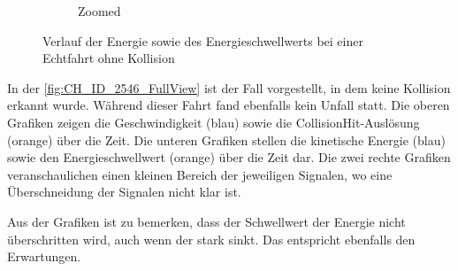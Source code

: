 \begin{figure}[H]
\begin{subfigure}{0.41\textwidth}
		\caption{Zoomed}
		\label{fig:CH_speed_CHEnergy_zoomed_eps}
	\end{subfigure}
	\caption{Verlauf der Energie sowie des Energieschwellwerts bei einer Echtfahrt ohne Kollision}
	\label{fig:CH_ID_2546_FullView}
\end{figure}


In der \autoref{fig:CH_ID_2546_FullView} ist der Fall vorgestellt, in dem keine Kollision erkannt wurde. Während dieser Fahrt fand ebenfalls kein Unfall statt. 
Die oberen Grafiken zeigen die Geschwindigkeit (blau) sowie die CollisionHit-Auslösung (orange) über die Zeit.
Die unteren Grafiken stellen die kinetische Energie (blau) sowie den Energieschwellwert (orange) über die Zeit dar.
Die zwei rechte Grafiken veranschaulichen einen kleinen Bereich der jeweiligen Signalen, wo eine Überschneidung der Signalen nicht klar ist.

Aus der Grafiken ist zu bemerken, dass der Schwellwert der Energie nicht überschritten wird, auch wenn der stark sinkt. Das entspricht ebenfalls den Erwartungen.

